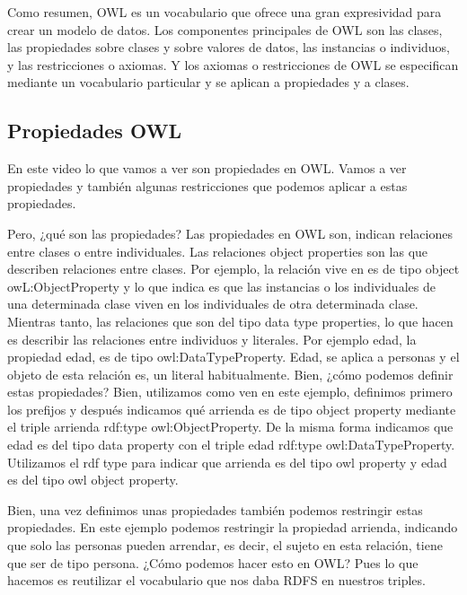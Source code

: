 Como resumen, OWL es un vocabulario que ofrece una gran expresividad para crear un modelo de datos. Los componentes principales de OWL son las clases, las propiedades sobre clases y sobre valores de datos, las instancias o individuos, y las restricciones o axiomas. Y los axiomas o restricciones de OWL se especifican mediante un vocabulario particular y se aplican a propiedades y a clases.

\subsection{Propiedades OWL}

En este video lo que vamos a ver son propiedades en OWL. Vamos a ver propiedades y también algunas restricciones que podemos aplicar a estas propiedades.

Pero, ¿qué son las propiedades? Las propiedades en OWL son, indican relaciones entre clases o entre individuales. Las relaciones object properties son las que describen relaciones entre clases. Por ejemplo, la relación vive en es de tipo object owL:ObjectProperty y lo que indica es que las instancias o los individuales de una determinada clase viven en los individuales de otra determinada clase. Mientras tanto, las relaciones que son del tipo data type properties, lo que hacen es describir las relaciones entre individuos y literales. Por ejemplo edad, la propiedad edad, es de tipo owl:DataTypeProperty. Edad, se aplica a personas y el objeto de esta relación es, un literal habitualmente. Bien, ¿cómo podemos definir estas propiedades? Bien, utilizamos como ven en este ejemplo, definimos primero los prefijos y después indicamos qué arrienda es de tipo object property mediante el triple arrienda rdf:type owl:ObjectProperty. De la misma forma indicamos que edad es del tipo data property con el triple edad rdf:type owl:DataTypeProperty. Utilizamos el rdf type para indicar que arrienda es del tipo owl property y edad es del tipo owl object property.

Bien, una vez definimos unas propiedades también podemos restringir estas propiedades. En este ejemplo podemos restringir la propiedad arrienda, indicando que solo las personas pueden arrendar, es decir, el sujeto en esta relación, tiene que ser de tipo persona. ¿Cómo podemos hacer esto en OWL? Pues lo que hacemos es reutilizar el vocabulario que nos daba RDFS en nuestros triples.

